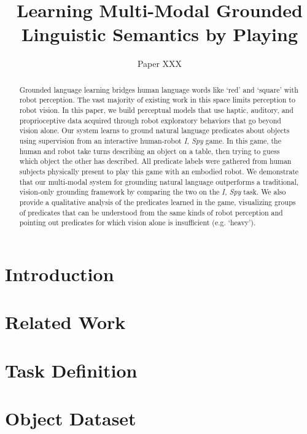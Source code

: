 \documentclass{article}
\title{Learning Multi-Modal Grounded Linguistic Semantics by Playing \ispy}
\author{Paper XXX}
\newcommand{\ispy}{\textit{I, Spy}\xspace}
\begin{document}
\maketitle

\begin{abstract}
Grounded language learning bridges human language words like `red' and `square' with robot perception.
The vast majority of existing work in this space limits perception to robot vision.
In this paper, we build perceptual models that use haptic, auditory, and proprioceptive data acquired through robot exploratory behaviors that go beyond vision alone.
Our system learns to ground natural language predicates about objects using supervision from an interactive human-robot \ispy game.
In this game, the human and robot take turns describing an object on a table, then trying to guess which object the other has described.
All predicate labels were gathered from human subjects physically present to play this game with an embodied robot.
We demonstrate that our multi-modal system for grounding natural language outperforms a traditional, vision-only grounding framework by comparing the two on the \ispy task.
We also provide a qualitative analysis of the predicates learned in the game, visualizing groups of predicates that can be understood from the same kinds of robot perception and pointing out predicates for which vision alone is insufficient (e.g. `heavy').
\end{abstract}

\section{Introduction}
\label{sec:introduction}
	

\section{Related Work}
\label{sec:relatedwork}
	

\section{Task Definition}
\label{sec:taskdefinition}
	

\section{Object Dataset}
\label{sec:dataset}
	
\end{document}
